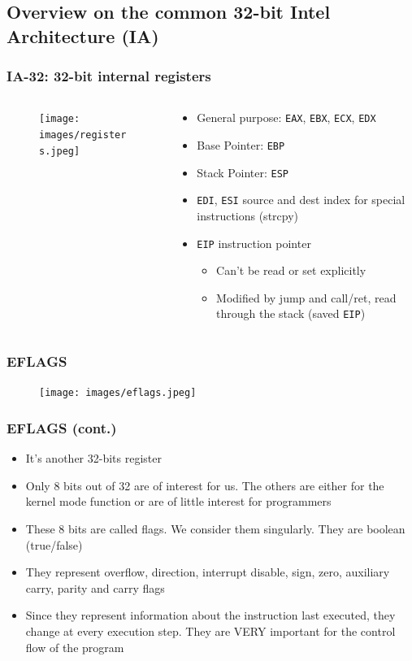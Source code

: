 \documentclass[]{beamer}
\begin{document}
\subsection{Overview on the common 32-bit Intel Architecture (IA)}
\begin{frame}
  \frametitle{IA-32: 32-bit internal registers}
  \begin{columns}
    \begin{column}{2.3in}
      \begin{figure}
        \texttt{[image: images/registers.jpeg]}
        \label{Registers Division}
      \end{figure}
    \end{column}
    \begin{column}{2.4in}
    \begin{itemize}
    \item General purpose: {\tt EAX}, {\tt EBX}, {\tt ECX}, {\tt EDX}
    \item Base Pointer: {\tt EBP}
    \item Stack Pointer: {\tt ESP}
    \item {\tt EDI}, {\tt ESI} source and dest index for special instructions (strcpy)
    \item {\tt EIP} instruction pointer
      \begin{itemize}
        \item Can't be read or set explicitly
        \item Modified by jump and call/ret, read through the stack (saved {\tt EIP})
      \end{itemize}
    \end{itemize}
    \end{column}
  \end{columns}
\end{frame}

\begin{frame}
  \frametitle{EFLAGS}
  \begin{figure}
    \texttt{[image: images/eflags.jpeg]}
    \label{Eflags idea}
  \end{figure}
\end{frame}
\begin{frame}
  \frametitle{EFLAGS (cont.)}
  \begin{itemize}
  \item{It's another 32-bits register}
  \item{Only 8 bits out of 32 are of interest for us. The others are either for the kernel mode function or  are of little interest for programmers}
  \item{These 8 bits are called flags. We consider them singularly. They are boolean (true/false) }
  \item{They represent overflow, direction, interrupt disable, sign, zero, auxiliary carry, parity and carry flags}
  \item{Since they represent information about the instruction last executed, they change at every execution step. They are VERY important for the control flow of the program}
  \end{itemize}
\end{frame}
\end{document}
